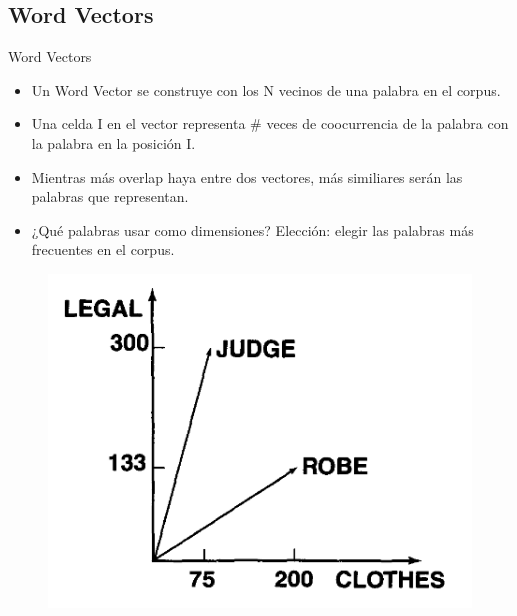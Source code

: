 \documentclass[xcolor=x11names,compress]{beamer}
\renewcommand{\(}{\begin{columns}}
\renewcommand{\)}{\end{columns}}
\newcommand{\<}[1]{\begin{column}{#1}}
\renewcommand{\>}{\end{column}}
\begin{document}
\subsection{Word Vectors}
\begin{frame}{Word Vectors}
\begin{itemize}
\item Un Word Vector se construye con los N vecinos de una palabra en el corpus.
\item Una celda I en el vector representa \# veces de coocurrencia de la palabra con la palabra en la posición I.
\item Mientras más overlap haya entre dos vectores, más similiares serán las palabras que representan.
\item ¿Qué palabras usar como dimensiones? Elección: elegir las palabras más frecuentes en el corpus.
\end{itemize}
\begin{figure}
\centering
\includegraphics[scale=0.24, keepaspectratio=True, natwidth=800,natheight=600]{word_vector.png}
\end{figure}
\end{frame}

\end{document}
